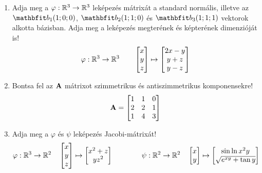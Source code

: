 \documentclass{szb-practice}
\begin{document}
\begin{enumerate}
  \item Adja meg a $\varphi : \mathbb{R}^3 \to \mathbb{R}^3$ leképezés mátrixát a
        standard normális, illetve az $\rvec b_1(1; 0; 0)$, $\rvec b_2(1; 1; 0)$
        és $\rvec b_3(1; 1; 1)$ vektorok alkotta bázisban. Adja meg a leképezés
        megterének és képterének dimenzióját is!
        $$
          \varphi : \mathbb{R}^3 \to \mathbb{R}^3
          \qquad
          \begin{bmatrix}
            x \\ y \\ z
          \end{bmatrix}
          \mapsto
          \begin{bmatrix}
            2x - y \\ y + z \\ y - z
          \end{bmatrix}
        $$

  \item Bontsa fel az $\mathbf{A}$ mátrixot szimmetrikus és antiszimmetrikus
        komponensekre!
        $$
          \mathbf{A} = \begin{bmatrix}
            1 & 1 & 0 \\
            2 & 2 & 1 \\
            1 & 4 & 3
          \end{bmatrix}
        $$

  \item Adja meg a $\varphi$ és $\psi$ leképezés Jacobi-mátrixát!
        $$
          \varphi : \mathbb{R}^3 \to \mathbb{R}^2
          \quad
          \begin{bmatrix}
            x \\ y \\ z
          \end{bmatrix}
          \mapsto
          \begin{bmatrix}
            x^2 + z \\ y z^2
          \end{bmatrix}
          \qquad\qquad
          \psi : \mathbb{R}^2 \to \mathbb{R}^2
          \quad
          \begin{bmatrix}
            x \\ y
          \end{bmatrix}
          \mapsto
          \begin{bmatrix}
            \sin \ln x^2 y \\ \sqrt{e^{xy} + \tan y}
          \end{bmatrix}
        $$


\end{enumerate}
\end{document}
